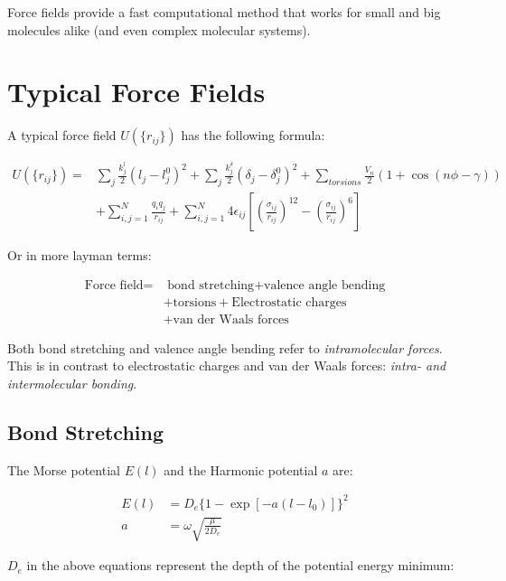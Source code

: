 \documentclass[
  letterpaper,
  DIV=11,
  numbers=noendperiod]{scrreprt}
\begin{document}
Force fields provide a fast computational method that works for small
and big molecules alike (and even complex molecular systems).

\hypertarget{typical-force-fields}{%
\section{Typical Force Fields}\label{typical-force-fields}}

A typical force field \(U(\{r_{ij}\})\) has the following formula:

\begin{align}
  U(\{r_{ij}\}) = &\sum_j\frac{k^l_j}{2}(l_j - l^0_j)^2 + \sum_j\frac{k^\delta_j}{2}(\delta_j - \delta_j^0)^2 + \sum_{torsions}\frac{V_n}{2}(1 + \cos(n\phi - \gamma)) \\ &+   
  \sum_{i, j = 1}^N\frac{q_iq_j}{r_{ij}} + \sum_{i, j = 1}^N4\epsilon_{ij}\left[\left(\frac{\sigma_{ij}}{r_{ij}}\right)^{12} - \left(\frac{\sigma_{ij}}{r_{ij}}\right)^6\right]
\end{align}

Or in more layman terms:

\begin{align}
  \text{Force field} = &\text{ bond stretching} + \text{valence angle bending} \\ 
  &+ \text{torsions} + \text{Electrostatic charges} \\ 
  &+ \text{van der Waals forces}
\end{align}

Both bond stretching and valence angle bending refer to
\emph{intramolecular forces}. This is in contrast to electrostatic
charges and van der Waals forces: \emph{intra- and intermolecular
bonding}.

\hypertarget{bond-stretching}{%
\subsection{Bond Stretching}\label{bond-stretching}}

The Morse potential \(E(l)\) and the Harmonic potential \(a\) are:

\begin{align}
  E(l) &= D_e\{1 - \exp[-a(l - l_0)]\}^2 \\ 
  a &= \omega \sqrt{\frac{\mu}{2D_e}}
\end{align}

\(D_e\) in the above equations represent the depth of the potential
energy minimum:
\end{document}
